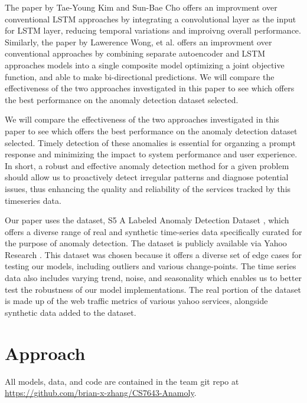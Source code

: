 \documentclass[10pt,twocolumn,letterpaper]{article}
\begin{document}
The paper by Tae-Young Kim and Sun-Bae Cho \cite{kim2018web} offers an improvment over conventional LSTM approaches by integrating a convolutional layer as the input for LSTM layer, reducing temporal variations 
and improivng overall performance. Similarly, the paper by Lawerence Wong, et al. \cite{wong2022aer} offers an improvment over conventional approaches by combining separate autoencoder and LSTM approaches models into 
a single composite model optimizing a joint objective function, and able to make bi-directional predictions. We will compare the effectiveness of the two approaches investigated in this paper to see 
which offers the best performance on the anomaly detection dataset selected.

We will compare the effectiveness of the two approaches investigated in this paper to see which offers the best performance on the anomaly detection dataset selected. Timely detection of these anomalies is essential for organzing a prompt response and minimizing the impact to system performance and user experience. 
In short, a robust and effective anomaly detection method for a given problem should allow us to proactively detect irregular patterns and diagnose potential issues, thus
enhancing the quality and reliability of the services tracked by this timeseries data. 

Our paper uses the dataset, S5 A Labeled Anomaly Detection Dataset \cite{yahooS5}, which offers a diverse range of real and synthetic time-series data specifically curated for the purpose of anomaly detection. 
The dataset is publicly available via Yahoo Research \cite{yahooS5}. This dataset was chosen because it offers a diverse set of edge cases for testing our models, including outliers and various change-points. 
The time series data also includes varying trend, noise, and seasonality which enables us to better test the robustness of our model implementations. 
The real portion of the dataset is made up of the web traffic metrics of various yahoo services, alongside synthetic data added to the dataset.

\section{Approach}
All models, data, and code are contained in the team git repo at \url{https://github.com/brian-x-zhang/CS7643-Anamoly}.
\end{document}

